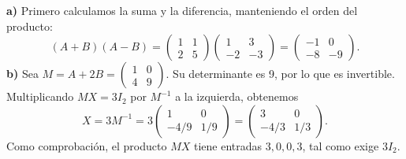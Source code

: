 \textbf{a)} Primero calculamos la suma y la diferencia, manteniendo el orden del producto:
\[
 (A+B)(A-B)
 =\begin{pmatrix}1&1\\2&5\end{pmatrix}
  \begin{pmatrix}1&3\\-2&-3\end{pmatrix}
 =\boxed{\begin{pmatrix}-1&0\\-8&-9\end{pmatrix}}.
\]
\textbf{b)} Sea $M=A+2B=\begin{pmatrix}1&0\\4&9\end{pmatrix}$. Su determinante es 9, por lo que es invertible. Multiplicando $MX=3I_2$ por $M^{-1}$ a la izquierda, obtenemos
\[
 X=3M^{-1}
 =3\begin{pmatrix}1&0\\-4/9&1/9\end{pmatrix}
 =\boxed{\begin{pmatrix}3&0\\-4/3&1/3\end{pmatrix}}.
\]
Como comprobación, el producto $MX$ tiene entradas $3,0,0,3$, tal como exige $3I_2$.
